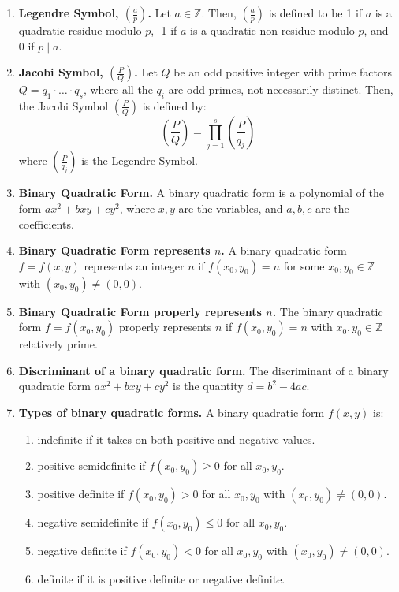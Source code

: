 \documentclass[12pt]{article}
\theoremstyle{definition}
\theoremstyle{named}
\begin{document}
\begin{enumerate}
    \item \textbf{Legendre Symbol, $\left(\frac{a}{p}\right)$. } Let $a \in \mathbb{Z}$. Then, $\left(\frac{a}{p}\right)$ is defined to be 1 if $a$ is a quadratic residue modulo $p$, -1 if $a$ is a quadratic non-residue modulo $p$, and 0 if $p \mid a$. 
    \item \textbf{Jacobi Symbol, $\left(\frac{P}{Q}\right)$. } Let $Q$ be an odd positive integer with prime factors $Q = q_1 \cdot \dots \cdot q_s$, where all the $q_i$ are odd primes, not necessarily distinct. Then, the Jacobi Symbol $\left(\frac{P}{Q}\right)$ is defined by: 
    $$
    \left(\frac{P}{Q}\right) = \prod_{j=1}^s \left(\frac{P}{q_j}\right)
    $$
    where $\left(\frac{P}{q_j}\right)$ is the Legendre Symbol. 
    \item \textbf{Binary Quadratic Form. } A binary quadratic form is a polynomial of the form $ax^2 + bxy + cy^2$, where $x,y$ are the variables, and $a,b,c$ are the coefficients. 
    \item \textbf{Binary Quadratic Form represents $n$. } A binary quadratic form $f=f(x,y)$ represents an integer $n$ if $f(x_0,y_0) = n$ for some $x_0,y_0 \in \mathbb{Z}$ with $(x_0,y_0) \neq (0,0)$. 
    \item \textbf{Binary Quadratic Form properly represents $n$. } The binary quadratic form $f=f(x_0,y_0)$ properly represents $n$ if $f(x_0,y_0) = n$ with $x_0,y_0 \in \mathbb{Z}$ relatively prime. 
    \item \textbf{Discriminant of a binary quadratic form. } The discriminant of a binary quadratic form $ax^2 + bxy + cy^2$ is the quantity $d = b^2 - 4ac$. 
    \item \textbf{Types of binary quadratic forms. } A binary quadratic form $f(x,y)$ is: 
    \begin{enumerate}
        \item indefinite if it takes on both positive and negative values. 
        \item positive semidefinite if $f(x_0,y_0) \geq 0$ for all $x_0,y_0$. 
        \item positive definite if $f(x_0,y_0) > 0$ for all $x_0,y_0$ with $(x_0,y_0) \neq (0,0)$. 
        \item negative semidefinite if $f(x_0,y_0) \leq 0$ for all $x_0,y_0$. 
        \item negative definite if $f(x_0,y_0) < 0$ for all $x_0,y_0$ with $(x_0,y_0) \neq (0,0)$. 
        \item definite if it is positive definite or negative definite. 

\end{enumerate}
\end{enumerate}
\end{document}
